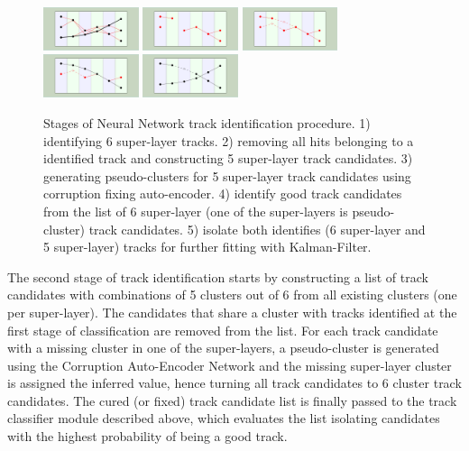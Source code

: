  \begin{figure}[!h]
\begin{center}
 \includegraphics[angle=90,width=1.1in]{images/iden_6_sl.pdf}
  \includegraphics[angle=90,width=1.1in]{images/iden_5_sl_a.pdf}
    \includegraphics[angle=90,width=1.1in]{images/iden_5_sl_b.pdf}
      \includegraphics[angle=90,width=1.1in]{images/iden_5_sl_c.pdf}
            \includegraphics[angle=90,width=1.1in]{images/iden_5_sl_d.pdf}
\caption {Stages of Neural Network track identification procedure. 1) identifying 6 super-layer tracks. 2) 
removing all hits belonging to a identified track and constructing 5 super-layer track candidates. 
3) generating pseudo-clusters for 5 super-layer track candidates using corruption fixing auto-encoder. 
4) identify good track candidates from the list of 6 super-layer (one of the super-layers is pseudo-cluster) 
track candidates. 5) isolate both identifies (6 super-layer and 5 super-layer) tracks  for further fitting with 
Kalman-Filter.}
 \label{network:procedure}
 \end{center}
\end{figure}

The second stage of track identification starts by constructing a list of track candidates with combinations 
of 5 clusters out of 6 from all existing clusters (one per super-layer). The candidates that share a cluster with 
tracks identified at the first stage of classification are removed from the list. For each track candidate with a 
missing cluster in one of the super-layers, a pseudo-cluster is generated using the Corruption Auto-Encoder 
Network and the missing super-layer cluster is assigned the inferred value, hence turning all track candidates 
to 6 cluster track candidates. The cured (or fixed) track candidate list is finally passed to the track classifier 
module described above, which evaluates the list isolating candidates with the highest probability of being a 
good track. 

